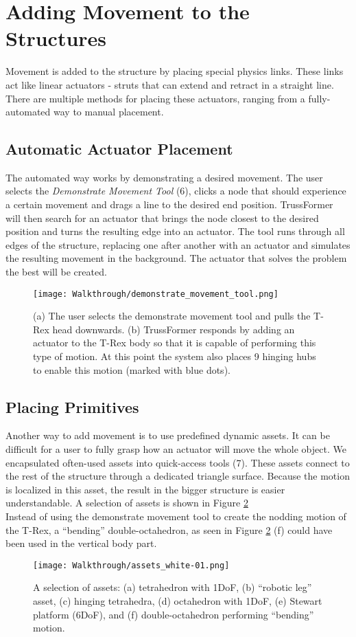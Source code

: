 \section{Adding Movement to the Structures}
Movement is added to the structure by placing special physics links. These links act like linear actuators - struts that can extend and retract in a straight line. There are multiple methods for placing these actuators, ranging from a fully-automated way to manual placement.

\subsection{Automatic Actuator Placement}
The automated way works by demonstrating a desired movement. The user selects the \textit{Demonstrate Movement Tool} (6), clicks a node that should experience a certain movement and drags a line to the desired end position. TrussFormer will then search for an actuator that brings the node closest to the desired position and turns the resulting edge into an actuator. The tool runs through all edges of the structure, replacing one after another with an actuator and simulates the resulting movement in the background. The actuator that solves the problem the best will be created.
\begin{figure}[h!]
    \texttt{[image: Walkthrough/demonstrate\_movement\_tool.png]}
    \centering
    \caption{(a) The user selects the demonstrate movement tool and pulls the T-Rex head downwards. (b) TrussFormer responds by adding an actuator to the T-Rex body so that it is capable of performing this type of motion. At this point the system also places 9 hinging hubs to enable this motion (marked with blue dots).}
    \label{fig:demonstrate_movement}
\end{figure}

\subsection{Placing Primitives}
Another way to add movement is to use predefined dynamic assets. It can be difficult for a user to fully grasp how an actuator will move the whole object. We encapsulated often-used assets into quick-access tools (7). These assets connect to the rest of the structure through a dedicated triangle surface. Because the motion is localized in this asset, the result in the bigger structure is easier understandable. A selection of assets is shown in Figure \ref{fig:dynamic_assets}\\
Instead of using the demonstrate movement tool to create the nodding motion of the T-Rex, a ``bending'' double-octahedron, as seen in Figure \ref{fig:dynamic_assets} (f) could have been used in the vertical body part.
\begin{figure}[h!]
    \texttt{[image: Walkthrough/assets\_white-01.png]}
    \centering
    \caption{A selection of assets: (a) tetrahedron with 1DoF, (b) “robotic leg” asset, (c) hinging tetrahedra, (d) octahedron with 1DoF, (e) Stewart platform (6DoF), and (f) double-octahedron performing “bending” motion.}
    \label{fig:dynamic_assets}
\end{figure}

